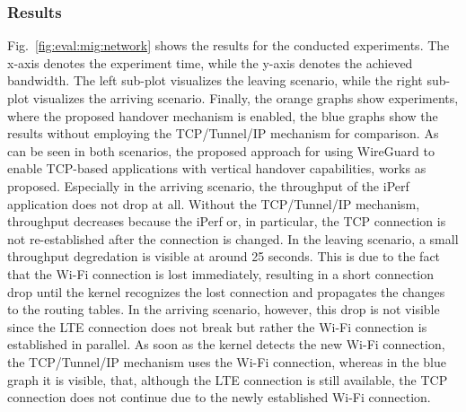 \subsubsection{Results}
Fig.~\ref{fig:eval:mig:network} shows the results for the conducted experiments.
The x-axis denotes the experiment time, while the y-axis denotes the achieved bandwidth.
The left sub-plot visualizes the leaving scenario, while the right sub-plot visualizes the arriving scenario.
Finally, the orange graphs show experiments, where the proposed handover mechanism is enabled, the blue graphs show the results without employing the TCP/Tunnel/IP mechanism for comparison.
As can be seen in both scenarios, the proposed approach for using WireGuard to enable TCP-based applications with vertical handover capabilities, works  as proposed.
Especially in the arriving scenario, the throughput of the iPerf application does not drop at all.
Without the TCP/Tunnel/IP mechanism, throughput decreases because the iPerf or, in particular, the TCP connection is not re-established after the connection is changed.
In the leaving scenario, a small throughput degredation is visible at around 25 seconds.
This is due to the fact that the Wi-Fi connection is lost immediately, resulting in a short connection drop until the kernel recognizes the lost connection and propagates the changes to the routing tables.
In the arriving scenario, however, this drop is not visible since the LTE connection does not break but rather the Wi-Fi connection is established in parallel.
As soon as the kernel detects the new Wi-Fi connection, the TCP/Tunnel/IP mechanism uses the Wi-Fi connection, whereas in the blue graph it is visible, that, although the LTE connection is still available, the TCP connection does not continue due to the newly established Wi-Fi connection.

